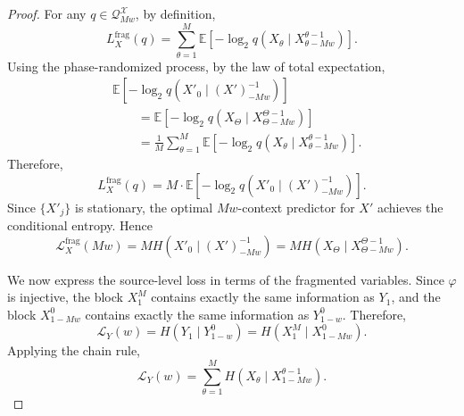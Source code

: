 \documentclass{article}
\theoremstyle{plain}
\theoremstyle{definition}
\theoremstyle{remark}
\begin{document}
\begin{proof}
    For any \(q\in\mathcal{Q}_{Mw}^{\mathcal X}\), by definition,
    \[
        L_X^{\mathrm{frag}}(q)
        =
        \sum_{\theta=1}^{M}
        \mathbb{E}\!\left[
            -\log_2
            q\!\left(
                X_{\theta}
                \mid
                X_{\theta-Mw}^{\theta-1}
            \right)
        \right].
    \]
    Using the phase-randomized process, by the law of total expectation,
    \begin{align*}
    &\mathbb{E}\!\left[
        -\log_2
        q\!\left(
            X'_0
            \mid
            (X')_{-Mw}^{-1}
        \right)
    \right] \\
    &\qquad =
    \mathbb{E}\!\left[
        -\log_2
        q\!\left(
            X_{\Theta}
            \mid
            X_{\Theta-Mw}^{\Theta-1}
        \right)
    \right] \\
    &\qquad =
    \frac{1}{M}
    \sum_{\theta=1}^{M}
    \mathbb{E}\!\left[
        -\log_2
        q\!\left(
            X_{\theta}
            \mid
            X_{\theta-Mw}^{\theta-1}
        \right)
    \right].
    \end{align*}
    Therefore,
    \[
        L_X^{\mathrm{frag}}(q)
        =
        M \cdot
        \mathbb{E}\!\left[
            -\log_2
            q\!\left(
                X'_0
                \mid
                (X')_{-Mw}^{-1}
            \right)
        \right].
    \]
    Since \(\{X'_j\}\) is stationary, the optimal \(Mw\)-context predictor for
    \(X'\) achieves the conditional entropy. Hence
    \begin{equation}
        \mathcal{L}_X^{\mathrm{frag}}(Mw)
        =
        M H\!\left(
            X'_0
            \mid
            (X')_{-Mw}^{-1}
        \right)
        =
        M H\!\left(
            X_{\Theta}
            \mid
            X_{\Theta-Mw}^{\Theta-1}
        \right).
        \label{eq:frag-loss-phase-randomized}
    \end{equation}
    
    We now express the source-level loss in terms of the fragmented variables. Since
    \(\varphi\) is injective, the block \(X_1^M\) contains exactly the same
    information as \(Y_1\), and the block \(X_{1-Mw}^{0}\) contains exactly the
    same information as \(Y_{1-w}^{0}\). Therefore,
    \[
        \mathcal{L}_Y(w)
        =
        H(Y_1\mid Y_{1-w}^{0})
        =
        H(X_1^M\mid X_{1-Mw}^{0}).
    \]
    Applying the chain rule,
    \begin{equation}
        \mathcal{L}_Y(w)
        =
        \sum_{\theta=1}^{M}
        H\!\left(
            X_{\theta}
            \mid
            X_{1-Mw}^{\theta-1}
        \right).
        \label{eq:Y-loss-chain-frag}
    \end{equation}
    

\end{proof}
\end{document}
